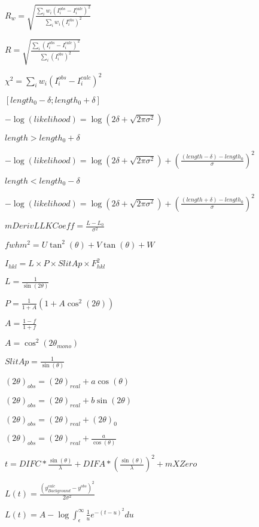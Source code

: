 \documentclass{article}
\begin{document}
$ R_{w}= \sqrt {\frac{\sum_i w_i\left( I_i^{obs}-I_i^{calc} \right)^2} {\sum_i w_i (I_i^{obs})^2} }$
\pagebreak

$ R= \sqrt {\frac{\sum_i \left( I_i^{obs}-I_i^{calc} \right)^2} {\sum_i (I_i^{obs})^2} }$
\pagebreak

$ \chi^2 = \sum_i w_i \left(I_i^{obs}-I_i^{calc} \right)^2 $
\pagebreak

$[length_{0}-\delta;length_{0}+\delta]$
\pagebreak

$ -\log(likelihood)= \log\left(2\delta+\sqrt{2\pi\sigma^2}\right)$
\pagebreak

$length > length_{0}+\delta$
\pagebreak

$ -\log(likelihood)= \log\left(2\delta+\sqrt{2\pi\sigma^2}\right) + \left(\frac{(length-\delta)-length_{0}}{\sigma} \right)^2$
\pagebreak

$length < length_{0}-\delta$
\pagebreak

$ -\log(likelihood)= \log\left(2\delta+\sqrt{2\pi\sigma^2}\right) + \left(\frac{(length+\delta)-length_{0}}{\sigma} \right)^2$
\pagebreak

$ mDerivLLKCoeff = \frac{L-L_0}{\sigma^2} $
\pagebreak

$ fwhm^2= U \tan^2(\theta) + V \tan(\theta) +W $
\pagebreak

$ I_{hkl} = L \times P \times SlitAp \times F_{hkl}^2 $
\pagebreak

$ L = \frac{1}{\sin(2\theta)} $
\pagebreak

$ P = \frac{1}{1+A}\left(1+A\cos^2(2\theta)\right) $
\pagebreak

$ A = \frac{1-f}{1+f} $
\pagebreak

$ A = \cos^2(2\theta_{mono}) $
\pagebreak

$ SlitAp = \frac{1}{\sin(\theta)} $
\pagebreak

$ (2\theta)_{obs} = (2\theta)_{real} + a\cos(\theta) $
\pagebreak

$ (2\theta)_{obs} = (2\theta)_{real} + b\sin(2\theta) $
\pagebreak

$ (2\theta)_{obs} = (2\theta)_{real} +(2\theta)_{0}$
\pagebreak

$ (2\theta)_{obs} = (2\theta)_{real} + \frac{a}{\cos(\theta)} $
\pagebreak

$ t = DIFC*\frac{\sin(\theta)}{\lambda} + DIFA*\left(\frac{\sin(\theta)}{\lambda}\right)^2 + mXZero$
\pagebreak

$ L(t) = \frac{\left(y^{calc}_{Background}-y^{obs}\right)^2}{2\sigma^2}$
\pagebreak

$ L(t) = A-\log{\int_\epsilon^{\infty} {\frac{1}{u} e^{-(t-u)^2} du}}$
\pagebreak
\end{document}
